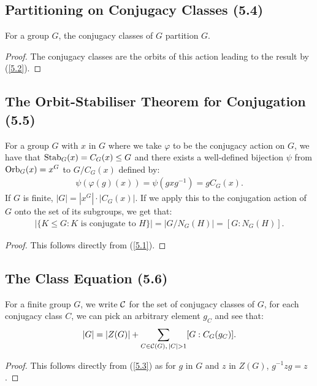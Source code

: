 \subsection{Partitioning on Conjugacy Classes (5.4)} \label{5.4}

For a group $G$, the conjugacy classes of $G$ partition $G$.

\begin{proof}
    The conjugacy classes are the orbits of this action leading to the result by (\ref{5.2}).
\end{proof}

\subsection{The Orbit-Stabiliser Theorem for Conjugation (5.5)} \label{5.5}

For a group $G$ with $x$ in $G$ where we take $\varphi$ to be the conjugacy action on $G$, 
we have that 
$\operatorname{Stab}_G(x) = C_G(x) \leq G$ and there exists a well-defined bijection 
$\psi$ from $\operatorname{Orb}_G(x) = x^G$ to $G / C_G(x)$  defined by: \begin{align*}
    \psi(\varphi(g)(x)) = \psi(gxg^{-1}) = gC_G(x).
\end{align*} If $G$ is finite, $|G| = |x^G| \cdot |C_G(x)|$. If we apply
this to the conjugation action of $G$ onto the set of its subgroups,
we get that: \begin{align*}
    |\{K \leq G : K \text{ is conjugate to } H\}|
    = |G / N_G(H)|
    = [G : N_G(H)].
\end{align*}

\begin{proof}
    This follows directly from (\ref{5.1}).
\end{proof}

\subsection{The Class Equation (5.6)} \label{5.6}

For a finite group $G$, we write $\mathcal{C}$ for the set of conjugacy classes
of $G$, for each conjugacy class $C$, we can pick an arbitrary element
$g_C$ and see that: \begin{align*}
    |G| = |Z(G)| + \sum_{C \in \mathcal{C}(G), \, |C| > 1} [G : C_G(g_C)].
\end{align*}

\begin{proof}
    This follows directly from (\ref{5.3}) as for $g$ in $G$ and $z$ in $Z(G)$, $g^{-1}zg = z$.
\end{proof}


